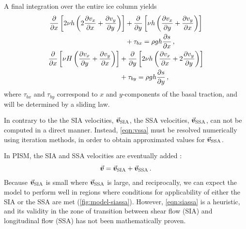 \documentclass[a4paper]{kappa}
\newcommand{\vect}[1]{\va*{#1}} %
\newcommand{\vv}[0]{\vect{v}}           %
\newcommand{\vsia}[0]{\vv_{\mathrm{SIA}}}   %
\newcommand{\vssa}[0]{\vv_{\mathrm{SSA}}}   %
\begin{document}
A final integration over the entire ice column yields
\citep[Eqs.~7.7--7.8]{Weis.etal.1999}
\begin{subequations}
\begin{gather}
  \label{eqn:vssa}
  \begin{split}
    \pdv{x} \left[2\relax{\nu}h
                  \left(2\pdv{v_x}{x} + \pdv{v_y}{y}\right) \right]
        &+ \pdv{y} \left[\relax{\nu}h
                         \left(\pdv{v_x}{y} + \pdv{v_y}{x}\right) \right] \\
        &+ \tau_{bx} = \rho gh \pdv{s}{x} \,,
  \end{split}\\
  \begin{split}
    \pdv{x} \left[\relax{\nu}H
                  \left(\pdv{v_x}{y} + \pdv{v_y}{x}\right) \right]
        &+ \pdv{y} \left[2\relax{\nu}h
                         \left(\pdv{v_x}{x} + 2\pdv{v_y}{y}\right) \right] \\
        &+ \tau_{by} = \rho gh \pdv{s}{y} \,,
  \end{split}
\end{gather}
\end{subequations}
where $\tau_{bx}$ and $\tau_{by}$ correspond to $x$ and $y$-components of the
basal traction, and will be determined by a sliding law.

In contrary to the the SIA velocities, $\vsia$, the SSA velocities, $\vssa$,
can not be computed in a direct manner. Instead, \cref{eqn:vssa} must be
resolved numerically using iteration methods, in order to obtain
approximated values for $\vssa$.

In PISM, the SIA and SSA velocities are eventually added
\citep[\cref{fig:model-siassa};][Eq.~15]{Winkelmann.etal.2011}:
\begin{equation}
    \label{eqn:siassa}
    \vv = \vsia + \vssa \,.
\end{equation}
Because $\vsia$ is small where $\vssa$ is large, and
reciprocally, we can expect the model to perform well in regions where
conditions for applicability of either the SIA or the SSA are met
(\cref{fig:model-siassa}). However,
\cref{eqn:siassa} is a heuristic, and its validity in the zone of
transition between shear flow (SIA) and longitudinal flow (SSA) has not been
mathematically proven.
\end{document}
